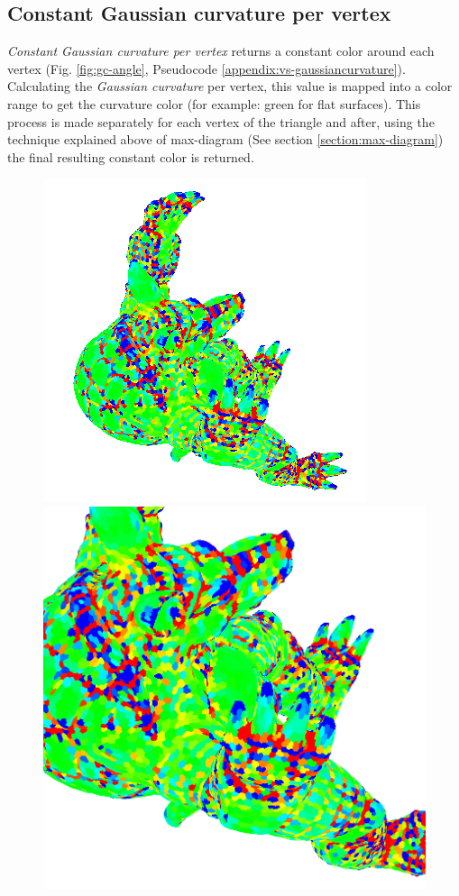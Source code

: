 
\subsection{Constant Gaussian curvature per vertex}
\textit{Constant Gaussian curvature per vertex} returns a constant color around each vertex (Fig. \ref{fig:gc-angle}, Pseudocode \ref{appendix:vs-gaussiancurvature}). Calculating the \textit{Gaussian curvature} per vertex, this value is mapped into a color range to get the curvature color (for example: green for flat surfaces). This process is made separately for each vertex of the triangle and after, using the technique explained above of max-diagram (See section \ref{section:max-diagram}) the final resulting constant color is returned.
\begin{figure}[!h]
    \centering
    \centering
    \includegraphics[scale=1.0]{images/gc-armadillo-top.png}
    \endminipage\hfill
    \centering
    \includegraphics[scale=0.4]{images/gc-detail-armadillo-top.png}

\end{figure}
